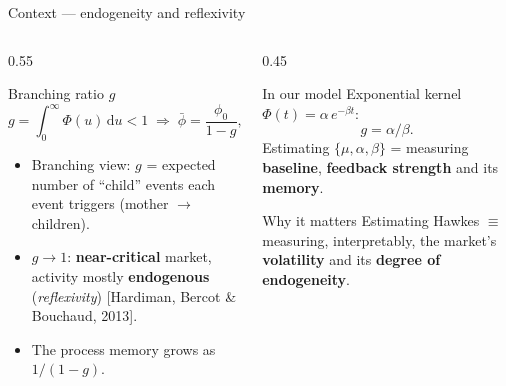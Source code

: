 \documentclass[aspectratio=169]{beamer}
\newcommand{\cit}[1]{{\footnotesize\color{mcmPrimary}[#1]}}
\begin{document}
\begin{frame}{Context — endogeneity and reflexivity}
  \begin{columns}[T]
    \begin{column}{0.55\textwidth}
      \begin{block}{Branching ratio $g$}
        \[
          g=\int_0^\infty \Phi(u)\,\mathrm{d}u<1
          \;\Rightarrow\;
          \bar\phi=\frac{\phi_0}{1-g},\quad \bar S=\frac{1}{1-g}.
        \]
        \begin{itemize}\footnotesize
          \item Branching view: $g$ = expected number of ``child'' events each event triggers (mother $\to$ children).
          \item $g\to 1$: \textbf{near-critical} market, activity mostly \textbf{endogenous} (\emph{reflexivity}) \cit{Hardiman, Bercot \& Bouchaud, 2013}.
          \item The process memory grows as $1/(1-g)$.
        \end{itemize}
      \end{block}
    \end{column}
    \begin{column}{0.45\textwidth}
      \begin{block}{In our model}
        Exponential kernel $\Phi(t)=\alpha\,e^{-\beta t}$:
        \[ g=\alpha/\beta. \]
        Estimating $\{\mu,\alpha,\beta\}$ = measuring \textbf{baseline}, \textbf{feedback strength} and its \textbf{memory}.
      \end{block}
      \begin{alertblock}{Why it matters}
        Estimating Hawkes $\equiv$ measuring, interpretably, the market's \textbf{volatility} and its \textbf{degree of endogeneity}.
      \end{alertblock}
    \end{column}
  \end{columns}
\end{frame}

\end{document}
